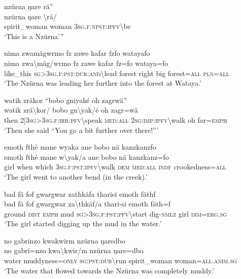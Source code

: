 \ea\label{ex:6:a1231}
nzürna ŋare rä''\\
\gll nzürna	ŋare	{\textbackslash}rä/\\
     spirit\_woman	woman	3\textsc{sg}.\textsc{f}:\textsc{npst}:\textsc{ipfv}{\textbackslash}be\\
\glt `This is a Nzürna'''
\z

\ea\label{ex:6:a1232}
nima zwamägwrmo fz zawe kafar fzfo watayafo\\
\gll nima	zwa{\textbackslash}mäg/wrmo	fz	zawe	kafar	fz=fo	wataya=fo\\
     like\_this	\textsc{sg}>3\textsc{sg}.\textsc{f}:\textsc{pst}:\textsc{dur}:\textsc{and}{\textbackslash}lead	forest	right	big	forest=\textsc{all}	\textsc{pln}=\textsc{all}\\
\glt `The Nzürna was leading her further into the forest at Wataya.'
\z

\ea\label{ex:6:a1233}
watik zräkor ``bobo gniyaké oh zagrwä''\\
\gll watik	zrä{\textbackslash}kor/	bobo	gn{\textbackslash}yak/é	oh	zagr=wä\\
     then	2|3\textsc{sg}>3\textsc{sg}.\textsc{f}:\textsc{irr}:\textsc{pfv}{\textbackslash}speak	\textsc{med}:\textsc{all}	2\textsc{sg}:\textsc{imp}:\textsc{ipfv}{\textbackslash}walk	oh	far=\textsc{emph}\\
\glt `Then she said ``You go a bit further over there!'''
\z

\ea\label{ex:6:a1235}
emoth fthé mane wyaka ane bobo nä kanzkanzfo\\
\gll emoth	fthé	mane	w{\textbackslash}yak/a	ane	bobo	nä	kanzkanz=fo\\
     girl	when	which	3\textsc{sg}.\textsc{f}:\textsc{pst}:\textsc{ipfv}{\textbackslash}walk	\textsc{dem}	\textsc{med}:\textsc{all}	\textsc{indf}	crookedness=\textsc{all}\\
\glt `The girl went to another bend (in the creek).'
\z

\ea\label{ex:6:a1237}
bad fä fof gwargwar zathkäfa tharisi emoth fäthf\\
\gll bad	fä	fof	gwargwar	za{\textbackslash}thkäf/a	thari-si	emoth	fäth=f\\
     ground	\textsc{dist}	\textsc{emph}	mud	\textsc{sg}>3\textsc{sg}.\textsc{f}:\textsc{pst}:\textsc{pfv}{\textbackslash}start	dig-\textsc{nmlz}	girl	\textsc{dim}=\textsc{erg}.\textsc{sg}\\
\glt `The girl started digging up the mud in the water.'
\z

\ea\label{ex:6:a1239}
no gabrinzo kwakwirm nzürna ŋaredbo\\
\gll no	gabri=nzo	kwa{\textbackslash}kwir/m	nzürna	ŋare=dbo\\
     water	muddyness=\textsc{only}	\textsc{sg}:\textsc{pst}:\textsc{dur}{\textbackslash}run	spirit\_woman	woman=\textsc{all}.\textsc{anim}.\textsc{sg}\\
\glt `The water that flowed towards the Nzürna was completely muddy.'
\z


